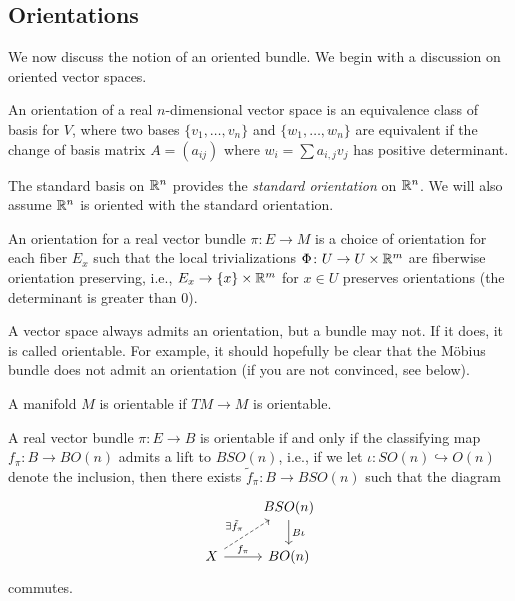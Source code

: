 \documentclass[ma3408.tex]{subfiles}
\begin{document}
\subsection*{Orientations}
We now discuss the notion of an oriented bundle. We begin with a discussion on oriented vector spaces. 
\begin{Rem}
An orientation of a real $n$-dimensional vector space is an equivalence class of basis for $V$, where two bases $\{ v_1,\ldots,v_n \}$ and $\{ w_1,\ldots, w_n \}$ are equivalent if the change of basis matrix $A = (a_{ij})$ where $w_i = \sum a_{i,j} v_j$ has positive determinant. 
\end{Rem}
\begin{Exa}
The standard basis on $\mathbb{R}^n$ provides the \emph{standard orientation} on $\mathbb{R}^n$. We will also assume $\mathbb{R}^n$ is oriented with the standard orientation. 
\end{Exa}
\begin{Def}
An orientation for a real vector bundle $\pi \colon E \to M$ is a choice of orientation for each fiber $E_x$ such that the local trivializations $\Phi \colon U \to U \times \mathbb{R}^m$ are fiberwise orientation preserving, i.e., $E_x \to \{ x \} \times \mathbb{R}^m$ for $x \in U$ preserves orientations (the determinant is greater than 0). 
\end{Def}
\begin{Rem}
A vector space always admits an orientation, but a bundle may not. If it does, it is called orientable. For example, it should hopefully be clear that the M\"obius bundle does not admit an orientation (if you are not convinced, see  below). 
\end{Rem}
\begin{Def}
A manifold $M$ is orientable if $TM \to M$ is orientable. 
\end{Def}
\begin{Prop}
A real vector bundle $\pi \colon E \to B$ is orientable if and only if the classifying map $f_{\pi} \colon B \to BO(n)$ admits a lift to $BSO(n)$, i.e., if we let $\iota \colon SO(n) \hookrightarrow O(n)$ denote the inclusion, then there exists $\tilde f_{\pi} \colon B \to BSO(n)$ such that the diagram
\[\begin{tikzcd}[ampersand replacement=\&]
    \& {BSO(n)} \\
    X \& {BO(n)}
    \arrow["{f_{\pi}}", from=2-1, to=2-2]
    \arrow["{\exists \tilde f_{\pi}}", dashed, from=2-1, to=1-2]
    \arrow["B\iota", from=1-2, to=2-2]
\end{tikzcd}\]
commutes. 
\end{Prop}
\end{document}
